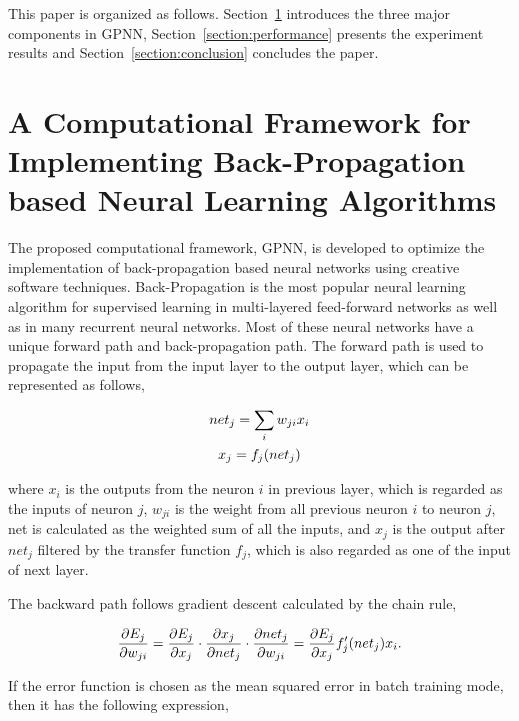 \documentclass[procedia]{easychair}
\begin{document}
This paper is organized as follows.  Section~\ref{section:implementation} introduces the three major components in GPNN, Section~\ref{section:performance} presents the experiment results and Section~\ref{section:conclusion} concludes the paper.


\section{A Computational Framework for Implementing Back-Propagation based Neural Learning Algorithms}
\label{section:implementation}

The proposed computational framework, GPNN, is developed to optimize the implementation of back-propagation based neural networks using creative software techniques. Back-Propagation is the most popular neural learning algorithm for supervised learning in multi-layered feed-forward networks as well as in many recurrent neural networks.  Most of these neural networks have a unique forward path and back-propagation path.  The forward path is used to propagate the input from the input layer to the output layer, which can be represented as follows,

\begin{gather}
    net_j = \sum_i w_{ji} x_i \notag \\
    x_j = f_j(net_j) \notag
\end{gather}

where $x_i$ is the outputs from the neuron $i$ in previous layer, which is regarded as the inputs of neuron $j$, $w_{ji}$ is the weight from all previous neuron $i$ to neuron $j$, net is calculated as the weighted sum of all the inputs, and $x_j$ is the output after $net_j$ filtered by the transfer function $f_j$, which is also regarded as one of the input of next layer.

The backward path follows gradient descent calculated by the chain rule,

\begin{equation}
    \frac{ \partial E_j }{ \partial w_{ji} } = \frac{ \partial E_j }{ \partial x_j } \cdot \frac{ \partial x_j }{ \partial net_j } \cdot \frac{ \partial net_j }{ \partial w_{ji} } = \frac{ \partial E_j }{ \partial x_j } f'_j(net_j) x_i \text{.} \notag
\end{equation}

If the error function is chosen as the mean squared error in batch training mode, then it has the following expression,
\end{document}
